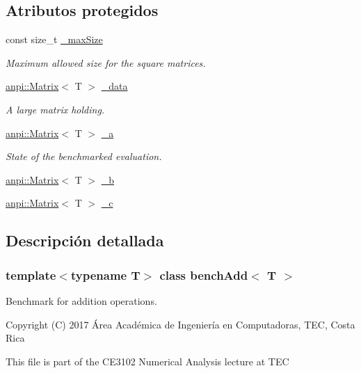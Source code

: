 \subsection*{Atributos protegidos}
\begin{DoxyCompactItemize}
\item 
const size\+\_\+t \hyperlink{classbenchAdd_a65b40e28442f3cdabcfaa40054f26ce6}{\+\_\+max\+Size}
\begin{DoxyCompactList}\small\item\em Maximum allowed size for the square matrices. \end{DoxyCompactList}\item 
\hyperlink{classanpi_1_1Matrix}{anpi\+::\+Matrix}$<$ T $>$ \hyperlink{classbenchAdd_afb4633add18175ba74873700d3c21261}{\+\_\+data}
\begin{DoxyCompactList}\small\item\em A large matrix holding. \end{DoxyCompactList}\item 
\hyperlink{classanpi_1_1Matrix}{anpi\+::\+Matrix}$<$ T $>$ \hyperlink{classbenchAdd_a133822bc19df3f71f9635d6e368ee592}{\+\_\+a}
\begin{DoxyCompactList}\small\item\em State of the benchmarked evaluation. \end{DoxyCompactList}\item 
\hyperlink{classanpi_1_1Matrix}{anpi\+::\+Matrix}$<$ T $>$ \hyperlink{classbenchAdd_a334aa4e387cd9964869af2a6f53882b1}{\+\_\+b}
\item 
\hyperlink{classanpi_1_1Matrix}{anpi\+::\+Matrix}$<$ T $>$ \hyperlink{classbenchAdd_a4f13657c7fb6a5d2f66ef0c9a9613005}{\+\_\+c}
\end{DoxyCompactItemize}


\subsection{Descripción detallada}
\subsubsection*{template$<$typename T$>$\newline
class bench\+Add$<$ T $>$}

Benchmark for addition operations. 

Copyright (C) 2017 Área Académica de Ingeniería en Computadoras, T\+EC, Costa Rica

This file is part of the C\+E3102 Numerical Analysis lecture at T\+EC

